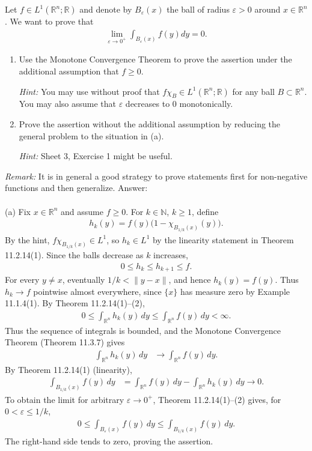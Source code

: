 \documentclass[12pt,a4paper]{article}
\begin{document}
Let $f \in L^1(\mathbb{R}^n;\mathbb{R})$ and denote by $B_\varepsilon(x)$ the ball of radius $\varepsilon > 0$ around $x \in \mathbb{R}^n$. We want to prove that
\begin{align*}
\lim_{\varepsilon \to 0^+} \int_{B_\varepsilon(x)} f(y)dy = 0.
\end{align*}
\begin{enumerate}
\item[(a)] Use the Monotone Convergence Theorem to prove the assertion under the additional assumption that $f \geq 0$.

\textit{Hint:} You may use without proof that $f\chi_B \in L^1(\mathbb{R}^n;\mathbb{R})$ for any ball $B \subset \mathbb{R}^n$. You may also assume that $\varepsilon$ decreases to $0$ monotonically.

\item[(b)] Prove the assertion without the additional assumption by reducing the general problem to the situation in (a).

\textit{Hint:} Sheet 3, Exercise 1 might be useful.
\end{enumerate}
\textit{Remark:} It is in general a good strategy to prove statements first for non-negative functions and then generalize.
\vspace{1cm}
\noindent
Answer:\\
\\


(a) Fix $x\in\mathbb{R}^n$ and assume $f\geq0$. For $k\in\mathbb{N}$, $k\geq1$, define
\begin{align*}
h_k(y)=f(y)\bigl(1-\chi_{B_{1/k}(x)}(y)\bigr).
\end{align*}
By the hint, $f\chi_{B_{1/k}(x)}\in L^1$, so $h_k\in L^1$ by the linearity statement in Theorem 11.2.14(1). Since the balls decrease as $k$ increases,
\begin{align*}
0\leq h_k\leq h_{k+1}\leq f.
\end{align*}
For every $y\neq x$, eventually $1/k<\lVert y-x\rVert$, and hence $h_k(y)=f(y)$. Thus $h_k\to f$ pointwise almost everywhere, since $\{x\}$ has measure zero by Example 11.1.4(1). By Theorem 11.2.14(1)--(2),
\begin{align*}
0\leq\int_{\mathbb{R}^n}h_k(y)\,dy
\leq\int_{\mathbb{R}^n}f(y)\,dy<\infty.
\end{align*}
Thus the sequence of integrals is bounded, and the Monotone Convergence Theorem (Theorem 11.3.7) gives
\begin{align*}
\int_{\mathbb{R}^n}h_k(y)\,dy
&\longrightarrow\int_{\mathbb{R}^n}f(y)\,dy.
\end{align*}
By Theorem 11.2.14(1) (linearity),
\begin{align*}
\int_{B_{1/k}(x)}f(y)\,dy
&=\int_{\mathbb{R}^n}f(y)\,dy
-\int_{\mathbb{R}^n}h_k(y)\,dy
\longrightarrow0.
\end{align*}
To obtain the limit for arbitrary $\varepsilon\to0^+$, Theorem 11.2.14(1)--(2) gives, for $0<\varepsilon\leq1/k$,
\begin{align*}
0\leq\int_{B_\varepsilon(x)}f(y)\,dy
\leq\int_{B_{1/k}(x)}f(y)\,dy.
\end{align*}
The right-hand side tends to zero, proving the assertion.
\end{document}
